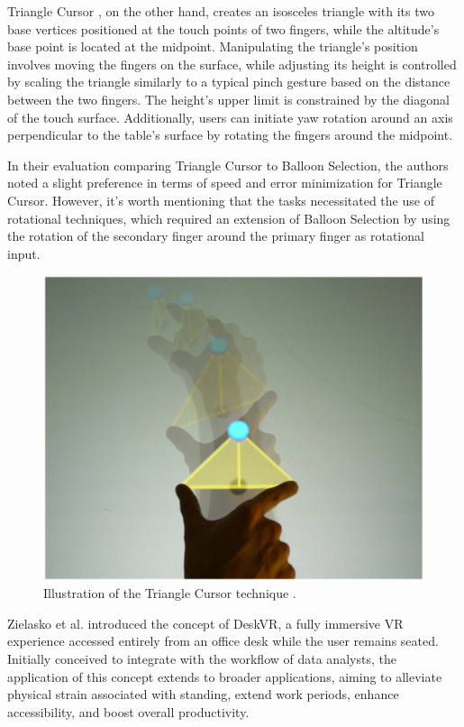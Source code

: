     Triangle Cursor \cite{strothoffTriangleCursorInteractions2011}, on the other hand, creates an isosceles triangle with its two base vertices positioned at the touch points of two fingers, while the altitude's base point is located at the midpoint. Manipulating the triangle's position involves moving the fingers on the surface, while adjusting its height is controlled by scaling the triangle similarly to a typical pinch gesture based on the distance between the two fingers. The height's upper limit is constrained by the diagonal of the touch surface. Additionally, users can initiate yaw rotation around an axis perpendicular to the table's surface by rotating the fingers around the midpoint.

    In their evaluation comparing Triangle Cursor to Balloon Selection, the authors noted a slight preference in terms of speed and error minimization for Triangle Cursor. However, it's worth mentioning that the tasks necessitated the use of rotational techniques, which required an extension of Balloon Selection by using the rotation of the secondary finger around the primary finger as rotational input.

    \begin{figure}[ht!]
        \centering
        \includegraphics[width=0.6\linewidth]{figures/triangle_cursor.png}
        \caption{Illustration of the Triangle Cursor technique \cite{strothoffTriangleCursorInteractions2011}.}
        \label{fig:sota_triangle}
    \end{figure}


   Zielasko et al. \cite{zielaskoRemainSeatedFullyimmersive2017} introduced the concept of DeskVR, a fully immersive VR experience accessed entirely from an office desk while the user remains seated. Initially conceived to integrate with the workflow of data analysts, the application of this concept extends to broader applications, aiming to alleviate physical strain associated with standing, extend work periods, enhance accessibility, and boost overall productivity.

